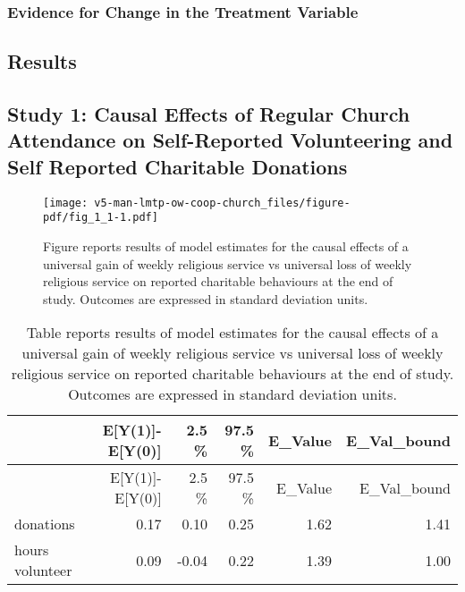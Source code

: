 \documentclass[
  singlecolumn]{article}
\begin{document}
\subsubsection{Evidence for Change in the Treatment
Variable}\label{evidence-for-change-in-the-treatment-variable}

\subsection{Results}\label{results}

\newpage{}

\subsection{Study 1: Causal Effects of Regular Church Attendance on
Self-Reported Volunteering and Self Reported Charitable
Donations}\label{study-1-causal-effects-of-regular-church-attendance-on-self-reported-volunteering-and-self-reported-charitable-donations}

\begin{figure}[H]

{\centering \texttt{[image: v5-man-lmtp-ow-coop-church\_files/figure-pdf/fig\_1\_1-1.pdf]}

}

\caption{Figure reports results of model estimates for the causal
effects of a universal gain of weekly religious service vs universal
loss of weekly religious service on reported charitable behaviours at
the end of study. Outcomes are expressed in standard deviation units.}

\end{figure}%

\label{tbl_1_1}
\begin{longtable}[]{@{}lrrrrr@{}}
\caption{Table reports results of model estimates for the causal effects
of a universal gain of weekly religious service vs universal loss of
weekly religious service on reported charitable behaviours at the end of
study. Outcomes are expressed in standard deviation
units.}\tabularnewline
\toprule\noalign{}
& E{[}Y(1){]}-E{[}Y(0){]} & 2.5 \% & 97.5 \% & E\_Value &
E\_Val\_bound \\
\midrule\noalign{}
\endfirsthead
\toprule\noalign{}
& E{[}Y(1){]}-E{[}Y(0){]} & 2.5 \% & 97.5 \% & E\_Value &
E\_Val\_bound \\
\midrule\noalign{}
\endhead
\bottomrule\noalign{}
\endlastfoot
donations & 0.17 & 0.10 & 0.25 & 1.62 & 1.41 \\
hours volunteer & 0.09 & -0.04 & 0.22 & 1.39 & 1.00 \\
\end{longtable}
\end{document}
